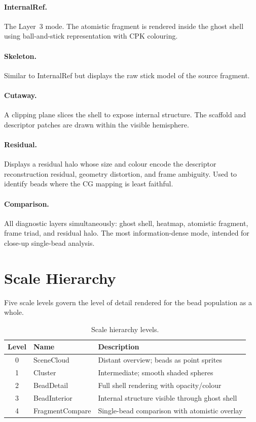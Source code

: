 \documentclass[12pt, a4paper, oneside]{article}
\begin{document}
\paragraph{InternalRef.}
The Layer~3 mode.  The atomistic fragment is rendered inside the
ghost shell using ball-and-stick representation with CPK colouring.

\paragraph{Skeleton.}
Similar to InternalRef but displays the raw stick model of the source
fragment.

\paragraph{Cutaway.}
A clipping plane slices the shell to expose internal structure.  The
scaffold and descriptor patches are drawn within the visible
hemisphere.

\paragraph{Residual.}
Displays a residual halo whose size and colour encode the descriptor
reconstruction residual, geometry distortion, and frame ambiguity.
Used to identify beads where the CG mapping is least faithful.

\paragraph{Comparison.}
All diagnostic layers simultaneously: ghost shell, heatmap, atomistic
fragment, frame triad, and residual halo.  The most information-dense
mode, intended for close-up single-bead analysis.

\section{Scale Hierarchy}

Five scale levels govern the level of detail rendered for the bead
population as a whole.

\begin{table}[htbp]
  \centering
  \caption{Scale hierarchy levels.}
  \label{tab:scale}
  \begin{tabular}{cll}
    \toprule
    Level & Name & Description \\
    \midrule
    0 & SceneCloud       & Distant overview; beads as point sprites \\
    1 & Cluster          & Intermediate; smooth shaded spheres \\
    2 & BeadDetail       & Full shell rendering with opacity/colour \\
    3 & BeadInterior     & Internal structure visible through ghost shell \\
    4 & FragmentCompare  & Single-bead comparison with atomistic overlay \\
    \bottomrule
  \end{tabular}
\end{table}
\end{document}
